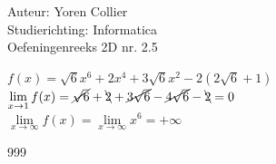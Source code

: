 \documentclass[a4paper]{article}
\newcommand{\Lh}{\left(} %
\newcommand{\Rh}{\right)}
\newcommand{\pnR}{\rightarrow} %
\newcommand{\limiet}{\lim\limits_}
\newcommand{\schrap}{\cancel}
\newcommand{\schrapb}{\bcancel} %
\begin{document}
\noindent \large Auteur: Yoren Collier \\
\noindent \large Studierichting: Informatica\\
\noindent \large Oefeningenreeks 2D nr. 2.5\\

\medskip

\normalsize

$f(x) = \sqrt{6} x^6 + 2x^4 + 3\sqrt{6} x^2 - 2\Lh 2\sqrt{6} + 1\Rh$\\

$\limiet{x \pnR 1} f(x) = \schrap{\sqrt{6}} + \schrapb{2} + \schrap{3\sqrt{6}} - \schrap{4\sqrt{6}} - \schrapb{2} = 0$\\

$\limiet{x \pnR \infty} f(x) = \limiet{x \pnR \infty} x^6 = +\infty$\\

\begin{thebibliography}{999}
\end{thebibliography}
\end{document}
